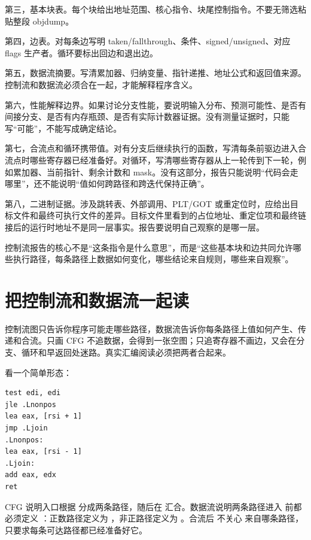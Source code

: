 第三，基本块表。每个块给出地址范围、核心指令、块尾控制指令。不要无筛选粘贴整段 objdump。

第四，边表。对每条边写明 taken/fallthrough、条件、signed/unsigned、对应 flags 生产者。循环要标出回边和退出边。

第五，数据流摘要。写清累加器、归纳变量、指针递推、地址公式和返回值来源。控制流和数据流必须合在一起，才能解释程序含义。

第六，性能解释边界。如果讨论分支性能，要说明输入分布、预测可能性、是否有间接分支、是否有内存瓶颈、是否有实际计数器证据。没有测量证据时，只能写“可能”，不能写成确定结论。

第七，合流点和循环携带值。对有分支后继续执行的函数，写清每条前驱边进入合流点时哪些寄存器已经准备好。对循环，写清哪些寄存器从上一轮传到下一轮，例如累加器、当前指针、剩余计数和 mask。没有这部分，报告只能说明“代码会走哪里”，还不能说明“值如何跨路径和跨迭代保持正确”。

第八，二进制证据。涉及跳转表、外部调用、PLT/GOT 或重定位时，应给出目标文件和最终可执行文件的差异。目标文件里看到的占位地址、重定位项和最终链接后的运行时地址不是同一层事实。报告要说明自己观察的是哪一层。

\begin{keyidea}
控制流报告的核心不是“这条指令是什么意思”，而是“这些基本块和边共同允许哪些执行路径，每条路径上数据如何变化，哪些结论来自规则，哪些来自观察”。
\end{keyidea}

\section{把控制流和数据流一起读}

控制流图只告诉你程序可能走哪些路径，数据流告诉你每条路径上值如何产生、传递和合流。只画 CFG 不追数据，会得到一张空图；只追寄存器不画边，又会在分支、循环和早返回处迷路。真实汇编阅读必须把两者合起来。

看一个简单形态：

\begin{lstlisting}
test edi, edi
jle .Lnonpos
lea eax, [rsi + 1]
jmp .Ljoin
.Lnonpos:
lea eax, [rsi - 1]
.Ljoin:
add eax, edx
ret
\end{lstlisting}

CFG 说明入口根据  分成两条路径，随后在  汇合。数据流说明两条路径进入  前都必须定义 ：正数路径定义为 ，非正路径定义为 。合流后  不关心  来自哪条路径，只要求每条可达路径都已经准备好它。

